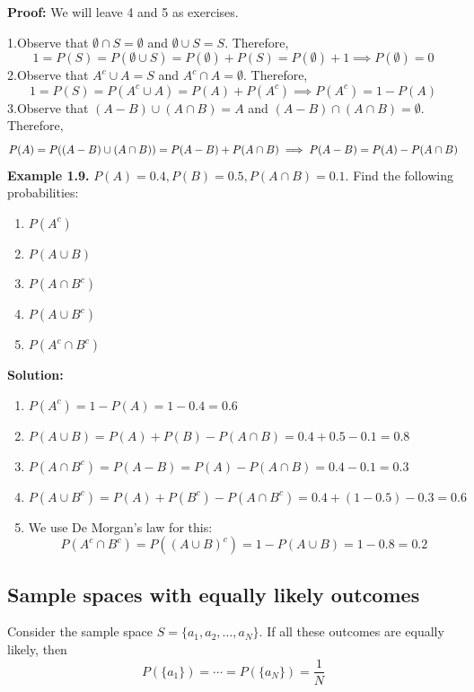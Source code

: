 \documentclass[
  12pt,
]{krantzNoCorner}
\providecommand{\tightlist}{%
  \setlength{\itemsep}{0pt}\setlength{\parskip}{0pt}}
\begin{document}
\textbf{Proof:} We will leave 4 and 5 as exercises.

1.Observe that \(\emptyset \cap S = \emptyset\) and
\(\emptyset \cup S = S.\) Therefore,
\[1=P(S)=P(\emptyset \cup S)=P(\emptyset)+P(S)=P(\emptyset)+1\implies P(\emptyset)=0\]
2.Observe that \(A^c\cup A = S\) and \(A^c\cap A = \emptyset\). Therefore,
\[1=P(S)=P(A^c\cup A)=P(A)+P(A^c)\implies P(A^c)=1-P(A)\] 3.Observe
that \((A-B)\cup (A\cap B)=A\) and \((A-B)\cap (A\cap B)=\emptyset.\)
Therefore,
\[P(A)=P((A-B)\cup (A\cap B))=P(A-B)+P(A\cap B)\\ \implies P(A-B) = P(A)-P(A\cap B)\]
\textbf{Example 1.9.} \(P(A)=0.4, P(B)=0.5,P(A\cap B)=0.1.\) Find the following
probabilities:

\begin{enumerate}
\def\labelenumi{\arabic{enumi}.}
\tightlist
\item
  \(P(A^c)\)
\item
  \(P(A\cup B)\)
\item
  \(P(A\cap B^c)\)
\item
  \(P(A\cup B^c)\)
\item
  \(P(A^c\cap B^c)\)
\end{enumerate}

\textbf{Solution:}

\begin{enumerate}
\def\labelenumi{\arabic{enumi}.}
\tightlist
\item
  \(P(A^c)=1-P(A) = 1-0.4 = 0.6\)
\item
  \(P(A\cup B)=P(A)+P(B)-P(A\cap B)=0.4+0.5-0.1 = 0.8\)
\item
  \(P(A\cap B^c)=P(A-B)=P(A)-P(A\cap B)= 0.4-0.1=0.3\)
\item
  \(P(A\cup B^c)=P(A)+P(B^c)-P(A\cap B^c)=0.4+(1-0.5)-0.3 = 0.6\)
\item
  We use De Morgan's law for this:
  \[P(A^c\cap B^c)=P((A\cup B)^c)=1-P(A\cup B )=1-0.8 = 0.2\]
\end{enumerate}

\hypertarget{sample-spaces-with-equally-likely-outcomes}{%
\subsection{Sample spaces with equally likely outcomes}\label{sample-spaces-with-equally-likely-outcomes}}

Consider the sample space \(S=\{a_1,a_2,\dots,a_N\}.\) If all these
outcomes are equally likely, then
\[P(\{a_1\})=\cdots=P(\{a_N\})=\frac{1}{N}\]
\end{document}
